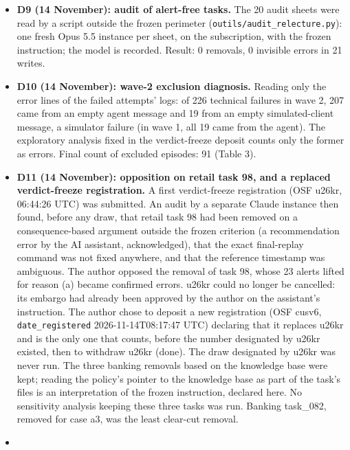 \begin{itemize}
\item
  \textbf{D9 (14 November): audit of alert-free tasks.} The 20 audit sheets were read by a script outside the frozen perimeter (\texttt{outils/\allowbreak{}audit\_\allowbreak{}relecture.\allowbreak{}py}): one fresh Opus 5.5 instance per sheet, on the subscription, with the frozen instruction; the model is recorded. Result: 0 removals, 0 invisible errors in 21 writes.
\item
  \textbf{D10 (14 November): wave-2 exclusion diagnosis.} Reading only the error lines of the failed attempts' logs: of 226 technical failures in wave 2, 207 came from an empty agent message and 19 from an empty simulated-client message, a simulator failure (in wave 1, all 19 came from the agent). The exploratory analysis fixed in the verdict-freeze deposit counts only the former as errors. Final count of excluded episodes: 91 (Table 3).
\item
  \textbf{D11 (14 November): opposition on retail task 98, and a replaced verdict-freeze registration.} A first verdict-freeze registration (OSF u26kr, 06:44:26 UTC) was submitted. An audit by a separate Claude instance then found, before any draw, that retail task 98 had been removed on a consequence-based argument outside the frozen criterion (a recommendation error by the AI assistant, acknowledged), that the exact final-replay command was not fixed anywhere, and that the reference timestamp was ambiguous. The author opposed the removal of task 98, whose 23 alerts lifted for reason (a) became confirmed errors. u26kr could no longer be cancelled: its embargo had already been approved by the author on the assistant's instruction. The author chose to deposit a new registration (OSF cusv6, \texttt{date\_\allowbreak{}registered} 2026-11-14T08:17:47 UTC) declaring that it replaces u26kr and is the only one that counts, before the number designated by u26kr existed, then to withdraw u26kr (done). The draw designated by u26kr was never run. The three banking removals based on the knowledge base were kept; reading the policy's pointer to the knowledge base as part of the task's files is an interpretation of the frozen instruction, declared here. No sensitivity analysis keeping these three tasks was run. Banking task\_082, removed for case a3, was the least clear-cut removal.
\item

\end{itemize}
